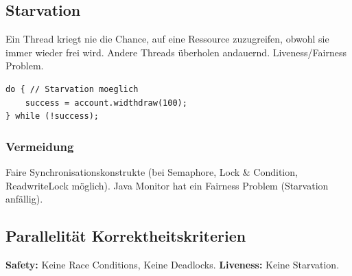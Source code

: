 \subsection{Starvation}
Ein Thread kriegt nie die Chance, auf eine Ressource zuzugreifen, obwohl sie immer wieder frei wird.
Andere Threads überholen andauernd. Liveness/Fairness Problem.
\begin{lstlisting}
do { // Starvation moeglich 
    success = account.widthdraw(100);
} while (!success);
\end{lstlisting}

\subsubsection{Vermeidung}
Faire Synchronisationskonstrukte (bei Semaphore, Lock \& Condition, ReadwriteLock möglich).
Java Monitor hat ein Fairness Problem (Starvation anfällig).

\subsection{Parallelität Korrektheitskriterien}
\textbf{Safety:} Keine Race Conditions, Keine Deadlocks.
\textbf{Liveness:} Keine Starvation.